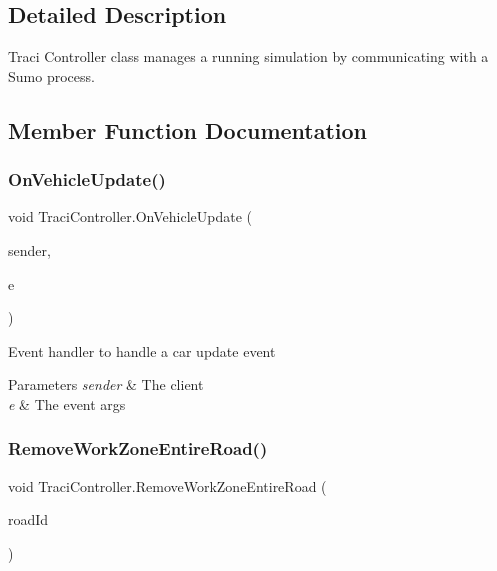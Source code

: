 \subsection{Detailed Description}
Traci Controller class manages a running simulation by communicating with a Sumo process. 



\subsection{Member Function Documentation}
\mbox{\label{class_traci_controller_ae059ca6ccc3a8ce34a4d133de3d5fade}} 
\subsubsection{\texorpdfstring{OnVehicleUpdate()}{OnVehicleUpdate()}}
{\footnotesize\ttfamily void Traci\+Controller.\+On\+Vehicle\+Update (\begin{DoxyParamCaption}\item[{object}]{sender,  }\item[{Traci.\+Types.\+Subscription\+Event\+Args}]{e }\end{DoxyParamCaption})}



Event handler to handle a car update event 


\begin{DoxyParams}{Parameters}
{\em sender} & The client\\
\hline
{\em e} & The event args\\
\hline
\end{DoxyParams}
\mbox{\label{class_traci_controller_a9678133938b5cf28566121ab6672dc34}} 
\subsubsection{\texorpdfstring{RemoveWorkZoneEntireRoad()}{RemoveWorkZoneEntireRoad()}}
{\footnotesize\ttfamily void Traci\+Controller.\+Remove\+Work\+Zone\+Entire\+Road (\begin{DoxyParamCaption}\item[{string}]{road\+Id }\end{DoxyParamCaption})}



